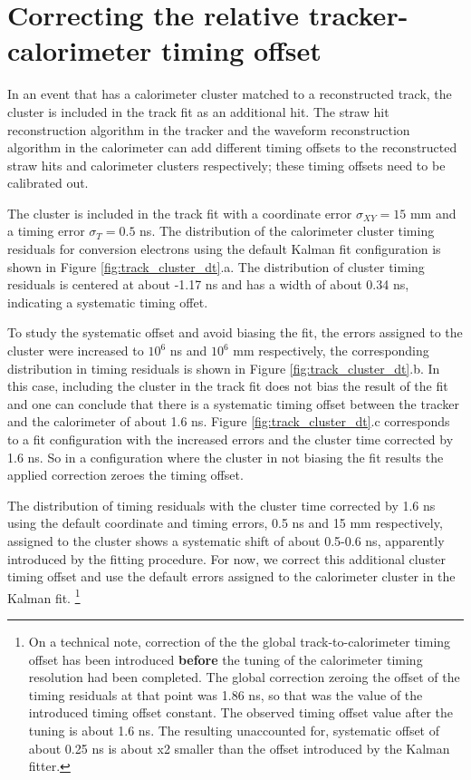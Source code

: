 \section{Correcting the relative tracker-calorimeter timing offset}

In an event that has a calorimeter cluster matched to a reconstructed track, the
cluster is included in the track fit as an additional hit. 
%
The straw hit reconstruction algorithm in the tracker and the waveform reconstruction 
algorithm in the calorimeter can add different timing offsets to the reconstructed straw hits
and calorimeter clusters respectively; these timing offsets need to be calibrated out.

The cluster is included in the track fit with a coordinate error $\sigma_{XY} = 15$ mm
and a timing error $\sigma_T = 0.5$ ns.
The distribution of the calorimeter cluster timing residuals for conversion electrons
using the default Kalman fit configuration is shown in Figure \ref{fig:track_cluster_dt}.a. 
The distribution of cluster timing residuals 
is centered at about -1.17 ns and has a width of about 0.34 ns, indicating a systematic timing offet.

To study the systematic offset and avoid biasing the fit, the errors assigned to the 
cluster were increased to $10^6$ ns and $10^6$ mm respectively,
the corresponding distribution in timing residuals is shown in Figure 
\ref{fig:track_cluster_dt}.b.
%
In this case, including the cluster in the track fit does not bias the result of the fit
and one can conclude that there is a systematic timing offset between the tracker
and the calorimeter of about 1.6 ns.
%
Figure \ref{fig:track_cluster_dt}.c corresponds to a fit configuration with
the increased errors and the cluster time corrected by 1.6 ns. So in a configuration
where the cluster in not biasing the fit results the applied correction zeroes
the timing offset.

The distribution of timing residuals with the cluster time corrected by 1.6 ns using
the default coordinate and timing errors, 0.5 ns and 15 mm respectively, 
assigned to the cluster shows a systematic shift of about 0.5-0.6 ns,
apparently introduced by the fitting procedure.
For now, we correct this additional cluster timing offset and use the default errors
assigned to the calorimeter cluster in the Kalman fit.
\footnote{
  On a technical note, correction of the the global track-to-calorimeter timing offset
  has been introduced
  {\bf before} the tuning of the calorimeter timing resolution had been completed. 
  The global correction zeroing the offset of the timing residuals at that point 
  was 1.86 ns, so that was the value of the introduced timing offset constant.
  The observed timing offset value after the tuning is about 1.6 ns. 
  The resulting unaccounted for, systematic offset of about 0.25 ns is about x2 smaller
  than the offset introduced by the Kalman fitter.
}

